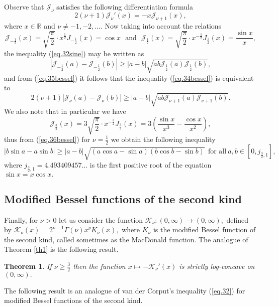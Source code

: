 \documentclass[10pt]{amsart}
\newtheorem{theorem}{Theorem}
\begin{document}
Observe that $\mathcal{J}_{\nu}$ satisfies the
following differentiation formula
\begin{equation}\label{eq.35bessel}
2(\nu+1)\mathcal{J}_{\nu}'(x)=-x\mathcal{J}_{\nu+1}(x),
\end{equation}
where $x\in\mathbb{R}$ and $\nu\neq -1,-2,{\dots}.$ Now taking into
account the relations
$$\mathcal{J}_{-\frac{1}{2}}(x)=\sqrt{\frac{\pi}{2}}\cdot x^{\frac{1}{2}}J_{-\frac{1}{2}}(x)=\cos
x\ \ \ \mbox{and}\ \ \ \mathcal{J}_{\frac{1}{2}}(x)=\sqrt{\frac{\pi}{2}}\cdot x^{-\frac{1}{2}}J_{\frac{1}{2}}(x)=\frac{\sin
x}{x},$$ the inequality (\ref{eq.32sine}) may be written as
$$|\mathcal{J}_{-\frac{1}{2}}(a)-\mathcal{J}_{-\frac{1}{2}}(b)|\geq
|a-b|\sqrt{ab\mathcal{J}_{\frac{1}{2}}(a)\mathcal{J}_{\frac{1}{2}}(b)},$$ and from
(\ref{eq.35bessel}) it follows that the inequality (\ref{eq.34bessel}) is
equivalent to
\begin{equation}\label{eq.36bessel}2(\nu+1)|\mathcal{J}_{\nu}(a)-\mathcal{J}_{\nu}(b)|\geq
|a-b|\sqrt{ab\mathcal{J}_{\nu+1}(a)\mathcal{J}_{\nu+1}(b)}.\end{equation}
We also note that in particular we have
$$\mathcal{J}_{\frac{3}{2}}(x)=3\sqrt{\frac{\pi}{2}}\cdot
x^{-\frac{3}{2}}J_{\frac{3}{2}}(x)=3\left(\frac{\sin x}{x^3}-\frac{\cos
x}{x^2}\right),$$ thus from (\ref{eq.36bessel}) for $\nu=\frac{1}{2}$ we obtain
the following inequality
$$|b\sin a-a\sin b|\geq |a-b|\sqrt{(a\cos a-\sin a)(b\cos
b-\sin b)} \ \ \mbox{for all}\
a,b\in[0,j_{\frac{3}{2},1}],$$
where $j_{\frac{3}{2},1}=4.493409457\dots$ is the first positive root of the equation $\sin x=x\cos x.$

\subsection{Modified Bessel functions of the second kind} Finally, for $\nu>0$ let us consider the function $\mathcal{K}_{\nu}:(0,\infty)\to(0,\infty),$ defined by $\mathcal{K}_{\nu}(x)=2^{\nu-1}\Gamma(\nu)x^{\nu}K_{\nu}(x),$ where $K_{\nu}$ is the modified Bessel function of the second kind, called sometimes as the MacDonald function. The analogue of Theorem \ref{th1} is the following result.

\begin{theorem}\label{th3k}
If $\nu\geq \frac{3}{2}$ then the function $x\mapsto-\mathcal{K}_{\nu}'(x)$ is strictly log-concave on $(0,\infty).$
\end{theorem}

The following result is an analogue of van der Corput's
inequality (\ref{eq.32}) for modified Bessel functions of the second kind.
\end{document}
